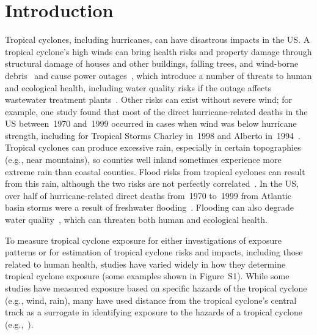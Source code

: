 \section*{Introduction}

Tropical cyclones, including hurricanes, can have disastrous impacts in the
\acf{US}. A tropical cyclone's high winds can bring health risks
and property damage through structural damage of houses and other buildings,
falling trees, and wind-borne debris~\parencite{rappaport2000} and cause power
outages~\parencite{liu2005, han2009}, which introduce a number of threats to human
and ecological health, including water quality risks if the outage affects
wastewater treatment plants~\parencite{mallin2006}.  Other risks can exist without
severe wind; for example, one study found that most of the direct
hurricane-related deaths in the \ac{US} between~1970 and~1999 occurred in cases
when wind was below hurricane strength, including for Tropical Storms Charley
in~1998 and Alberto in~1994~\parencite{rappaport2000}.  Tropical cyclones can
produce excessive rain, especially in certain topographies (e.g., near
mountains), so counties well inland sometimes experience more extreme rain than
coastal counties. Flood risks from tropical cyclones can result from this rain,
although the two risks are not perfectly correlated~\parencite{chen2015}. In the
\ac{US}, over half of hurricane-related direct deaths from~1970 to~1999 from
Atlantic basin storms were a result of freshwater flooding~\parencite{rappaport2000}. 
Flooding can also degrade water quality~\parencite{mallin2006}, which can threaten both 
human and ecological health.

To measure tropical cyclone exposure for either investigations of exposure
patterns or for estimation of tropical cyclone risks and impacts, including
those related to human health, studies have varied widely in how they determine
tropical cyclone exposure (some examples shown in Figure~S1). While some studies have measured exposure based on specific hazards
of the tropical cyclone (e.g., wind, rain), many have used distance from the
tropical cyclone's central track as a surrogate in identifying exposure to the
hazards of a tropical cyclone (e.g.,~\textcite{czajkowski2011, tansel2010,
kinney2008, caillouet2008increase}).  

